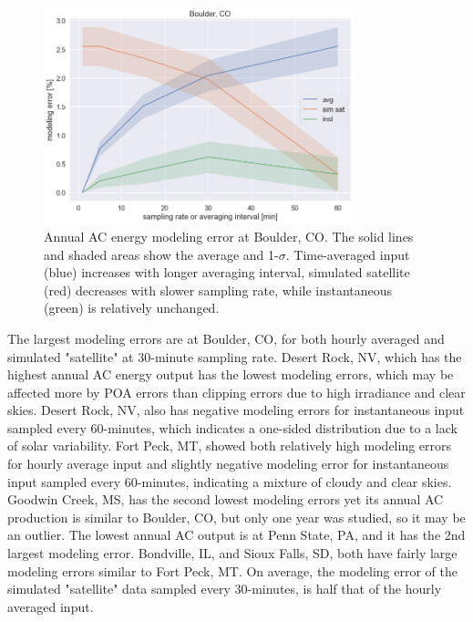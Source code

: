 \documentclass[conference]{IEEEtran}
\begin{document}
\begin{figure}[htbp]
\centerline{\includegraphics[width=9cm]{analysis/tbl_all.png}}
\caption{Annual AC energy modeling error at Boulder, CO. The solid lines and shaded areas show the average and 1-$\sigma$. Time-averaged input (blue) increases with longer averaging interval, simulated satellite (red) decreases with slower sampling rate, while instantaneous (green) is relatively unchanged.}
\label{fig:tbl2010}
\end{figure}

The largest modeling errors are at Boulder, CO, for both hourly averaged and simulated "satellite" at 30-minute sampling rate. Desert Rock, NV, which has the highest annual AC energy output has the lowest modeling errors, which may be affected more by POA errors than clipping errors due to high irradiance and clear skies. Desert Rock, NV, also has negative modeling errors for instantaneous input sampled every 60-minutes, which indicates a one-sided distribution due to a lack of solar variability. Fort Peck, MT, showed both relatively high modeling errors for hourly average input and slightly negative modeling error for instantaneous input sampled every 60-minutes, indicating a mixture of cloudy and clear skies. Goodwin Creek, MS, has the second lowest modeling errors yet its annual AC production is similar to Boulder, CO, but only one year was studied, so it may be an outlier. The lowest annual AC output is at Penn State, PA, and it has the 2nd largest modeling error. Bondville, IL, and Sioux Falls, SD, both have fairly large modeling errors similar to Fort Peck, MT. On average, the modeling error of the simulated "satellite" data sampled every 30-minutes, is half that of the hourly averaged input.
\end{document}
